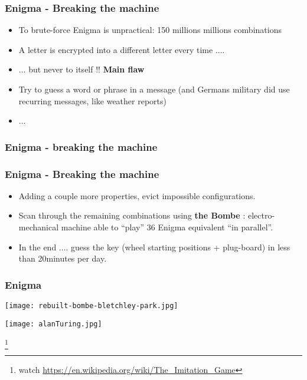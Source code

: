 \documentclass[
hyperref={pdfpagelabels=false}
,xcolor=table
]
{beamer}
\begin{document}
\begin{frame}
  \frametitle{Enigma - Breaking the machine}

  \begin{itemize}
  \item To brute-force Enigma is unpractical: 150 millions millions combinations
  \item A letter is encrypted into a different letter every time ....
  \item ... but never to itself !! \textbf{Main flaw}
  \item Try to guess a word or phrase in a message (and Germans military did use recurring messages, like weather reports)
  \item ... 
  \end{itemize}

\end{frame}

\begin{frame} 
  \frametitle{Enigma - breaking the machine}
  \begin{center}
  \end{center}
\end{frame}

\begin{frame}[fragile]
  \frametitle{Enigma - Breaking the machine}

  \begin{itemize}
  \item Adding a couple more properties, evict impossible configurations. 
  \item Scan through the remaining combinations using \textbf{the Bombe} : electro-mechanical machine able to ``play'' 36 Enigma equivalent ``in parallel''. 
  \item In the end .... guess the key (wheel starting positions + plug-board) in less than 20minutes per day. 
  \end{itemize}
 
\end{frame}



\begin{frame}
    \frametitle{Enigma}
  \begin{minipage}{0.45\textwidth}
    \texttt{[image: rebuilt-bombe-bletchley-park.jpg]}
  \end{minipage}
  \hfill
  \begin{minipage}{0.45\textwidth}
    \texttt{[image: alanTuring.jpg]}
  \end{minipage}

  \footnote*{watch \url{https://en.wikipedia.org/wiki/The_Imitation_Game}}
  
\end{frame}
\end{document}
